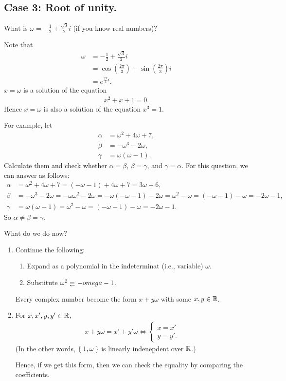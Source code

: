 \subsection{Case 3: Root of unity.}
What is  $\omega=-\frac{1}{2}+\frac{\sqrt{3}}{2}i$
(if you know real numbers)?

Note that
\begin{align*}
  \omega&=-\frac{1}{2}+\frac{\sqrt{3}}{2}i\\
  &=\cos(\frac{2\pi}{3})+\sin(\frac{2\pi}{3})i\\
  &=e^{\frac{2\pi}{3}i}.
\end{align*}
$x=\omega$ is a solution of the equation
\begin{align*}
  x^2+x+1=0.
\end{align*}
Hence $x=\omega$ is also a solution of the equation $x^3=1$.

For example, let
\begin{align*}
  \alpha &= \omega^2+4\omega+7,\\
  \beta &= -\omega^3 -2\omega,\\
  \gamma &= \omega(\omega-1).
\end{align*}
Calculate them and check whether $\alpha=\beta$, $\beta=\gamma$,
and $\gamma=\alpha$.
For this question, we can answer as follows:
\begin{align*}
  \alpha &= \omega^2+4\omega+7=(-\omega-1)+4\omega+7=3\omega+6,\\
  \beta &= -\omega^3 -2\omega= -\omega\omega^2 -2\omega=-\omega(-\omega-1)-2\omega=\omega^2-\omega=(-\omega-1)-\omega=-2\omega-1,\\
  \gamma &= \omega(\omega-1)=\omega^2-\omega=(-\omega-1)-\omega=-2\omega-1.
\end{align*}
So $\alpha\neq \beta=\gamma$.

What do we do now?
\begin{enumerate}
\item Continue the following:
  \begin{enumerate}
  \item Expand as a polynomial in the indeterminat (i.e., variable) $\omega$.
  \item Substitute $\omega^2\denotes -omega-1$.
  \end{enumerate}
  Every complex number become the form $x+y\omega$
  with some $x,y\in\mathbb{R}$.
\item For $x,x',y,y'\in\mathbb{R}$,
  \begin{align*}
      x+y\omega=x'+y'\omega \iff \begin{cases}x=x'\\y=y'.\end{cases}
  \end{align*}
  (In the other words,
  $\Set{1,\omega}$ is linearly indenepdent over $\mathbb{R}$.)

  Hence, if we get this form, then we can check the equality by
  comparing the coefficients.
\end{enumerate}

